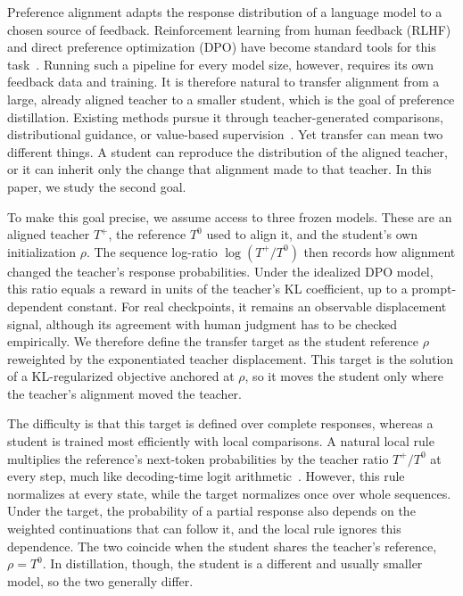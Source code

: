 \documentclass[pdflatex,sn-mathphys-num,review]{sn-jnl}
\theoremstyle{thmstyleone}
\theoremstyle{thmstyletwo}
\theoremstyle{thmstylethree}
\providecommand{\Tp}{T^{+}}
\providecommand{\Tz}{T^{0}}
\begin{document}
Preference alignment adapts the response distribution of a language model to a chosen source of feedback. Reinforcement learning from human feedback (RLHF) and direct preference optimization (DPO) have become standard tools for this task~\citep{ouyang2022training,rafailov2023direct}. Running such a pipeline for every model size, however, requires its own feedback data and training. It is therefore natural to transfer alignment from a large, already aligned teacher to a smaller student, which is the goal of preference distillation. Existing methods pursue it through teacher-generated comparisons, distributional guidance, or value-based supervision~\citep{zhang2024plad,gao2025advantage,kwon2025preference}. Yet transfer can mean two different things. A student can reproduce the distribution of the aligned teacher, or it can inherit only the change that alignment made to that teacher. In this paper, we study the second goal.

To make this goal precise, we assume access to three frozen models. These are an aligned teacher $\Tp$, the reference $\Tz$ used to align it, and the student's own initialization $\rho$. The sequence log-ratio $\log(\Tp/\Tz)$ then records how alignment changed the teacher's response probabilities. Under the idealized DPO model, this ratio equals a reward in units of the teacher's KL coefficient, up to a prompt-dependent constant. For real checkpoints, it remains an observable displacement signal, although its agreement with human judgment has to be checked empirically. We therefore define the transfer target as the student reference $\rho$ reweighted by the exponentiated teacher displacement. This target is the solution of a KL-regularized objective anchored at $\rho$, so it moves the student only where the teacher's alignment moved the teacher.

The difficulty is that this target is defined over complete responses, whereas a student is trained most efficiently with local comparisons. A natural local rule multiplies the reference's next-token probabilities by the teacher ratio $\Tp/\Tz$ at every step, much like decoding-time logit arithmetic~\citep{mitchell2024emulator,liu2024tuning}. However, this rule normalizes at every state, while the target normalizes once over whole sequences. Under the target, the probability of a partial response also depends on the weighted continuations that can follow it, and the local rule ignores this dependence. The two coincide when the student shares the teacher's reference, $\rho=\Tz$. In distillation, though, the student is a different and usually smaller model, so the two generally differ.
\end{document}
